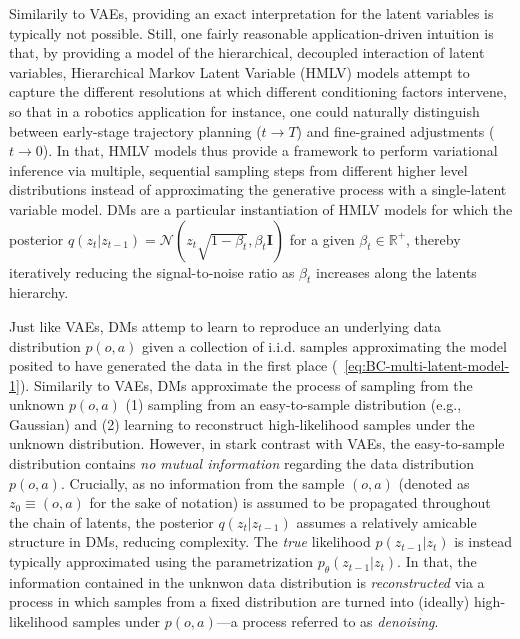 Similarily to VAEs, providing an exact interpretation for the latent variables is typically not possible.
Still, one fairly reasonable application-driven intuition is that, by providing a model of the hierarchical, decoupled interaction of latent variables, Hierarchical Markov Latent Variable (HMLV) models attempt to capture the different resolutions at which different conditioning factors intervene, so that in a robotics application for instance, one could naturally distinguish between early-stage trajectory planning (\( t \to T\)) and fine-grained adjustments (\( t \to 0 \)).
In that, HMLV models thus provide a framework to perform variational inference via multiple, sequential sampling steps from different higher level distributions instead of approximating the generative process with a single-latent variable model.
DMs are a particular instantiation of HMLV models for which the posterior \( q( z_t \vert z_{t-1}) = \mathcal N(z_t \sqrt{1-\beta_t}, \beta_t \mathbf{I}) \) for a given \( \beta_t \in \mathbb R^+ \), thereby iteratively reducing the signal-to-noise ratio as \( \beta_t \) increases along the latents hierarchy.

Just like VAEs, DMs attemp to learn to reproduce an underlying data distribution \( p (o,a) \) given a collection of i.i.d. samples approximating the model posited to have generated the data in the first place (~\ref{eq:BC-multi-latent-model-1}).
Similarily to VAEs, DMs approximate the process of sampling from the unknown \( p(o,a) \) (1) sampling from an easy-to-sample distribution (e.g., Gaussian) and (2) learning to reconstruct high-likelihood samples under the unknown distribution.
However, in stark contrast with VAEs, the easy-to-sample distribution contains \emph{no mutual information} regarding the data distribution \( p(o,a) \).
Crucially, as no information from the sample \( (o,a) \) (denoted as \( z_0 \equiv (o,a) \) for the sake of notation) is assumed to be propagated throughout the chain of latents, the posterior \( q(z_t \vert z_{t-1})\) assumes a relatively amicable structure in DMs, reducing complexity.
The \emph{true} likelihood \( p(z_{t-1} \vert z_t) \) is instead typically approximated using the parametrization \(  p_\theta (z_{t-1} \vert z_t) \).
In that, the information contained in the unknwon data distribution is \emph{reconstructed} via a process in which samples from a fixed distribution are turned into (ideally) high-likelihood samples under \( p(o,a) \)---a process referred to as \emph{denoising}.

